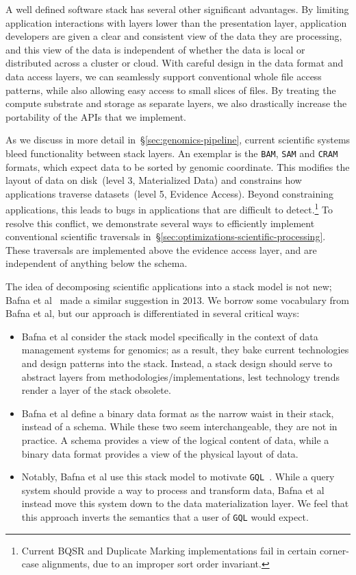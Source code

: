 \documentclass{sig-alternate}
\begin{document}
A well defined software stack has several other significant advantages. By limiting application
interactions with layers lower than the presentation layer, application developers are given a clear and
consistent view of the data they are processing, and this view of the data is independent of whether the
data is local or distributed across a cluster or cloud. With careful design in the data format and data access layers,
we can seamlessly
support conventional whole file access patterns, while also allowing easy access to small slices of files.
By treating the compute substrate and storage as separate layers, we also drastically increase
the portability of the APIs that we implement.

As we discuss in more detail in~\S\ref{sec:genomics-pipeline}, current scientific systems bleed functionality between
stack layers. An exemplar is the \texttt{BAM}, \texttt{SAM} and \texttt{CRAM} formats, which expect data
to be sorted by genomic coordinate. This modifies the layout of data on disk~(level 3, Materialized Data)
and constrains how applications traverse datasets~(level 5, Evidence Access). Beyond
constraining applications, this leads to bugs in applications that are difficult to detect.\footnote{Current BQSR and
Duplicate Marking implementations fail in certain corner-case alignments, due to an improper sort order invariant.}
To resolve this conflict, we demonstrate several ways to efficiently implement conventional scientific
traversals in~\S\ref{sec:optimizations-scientific-processing}. These traversals are implemented above the
evidence access layer, and are independent of anything below the schema.

The idea of decomposing scientific applications into a stack model is not new; Bafna et al~\cite{bafna13}
made a similar suggestion in 2013. We borrow some vocabulary from Bafna et al, but our approach is
differentiated in several critical ways:

\begin{itemize}
\item Bafna et al consider the stack model specifically in the context of data management systems for
genomics; as a result, they bake current technologies and design patterns into the stack. Instead, a stack
design should serve to abstract layers from methodologies/implementations, lest technology trends render
a layer of the stack obsolete.
\item Bafna et al define a binary data format as the narrow waist in their stack, instead of a schema.
While these two seem interchangeable, they are not in practice. A schema provides a view of the logical content
of data, while a binary data format provides a view of the physical layout of data.
\item Notably, Bafna et al use this stack model to motivate \texttt{GQL}~\cite{kozanitis14}. While a query system
should provide a way to process and transform data, Bafna et al instead move this system down to the
data materialization layer. We feel that this approach inverts the semantics that a user of \texttt{GQL} would expect.
\end{itemize}
\end{document}
